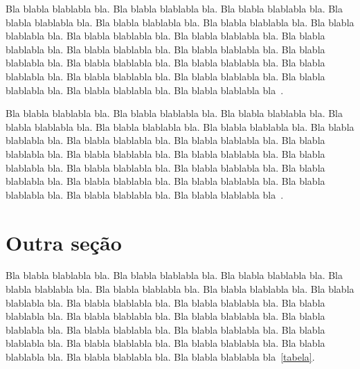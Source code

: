 \documentclass[tese,capa]{texufpel}
\begin{document}
Bla blabla blablabla bla.  Bla blabla blablabla bla.  Bla blabla
blablabla bla.  Bla blabla blablabla bla.  Bla blabla blablabla bla.
Bla blabla blablabla bla.  Bla blabla blablabla bla.  Bla blabla
blablabla bla.  Bla blabla blablabla bla.  Bla blabla blablabla bla.
Bla blabla blablabla bla.  Bla blabla blablabla bla.  Bla blabla
blablabla bla.  Bla blabla blablabla bla.  Bla blabla blablabla bla.
Bla blabla blablabla bla.  Bla blabla blablabla bla.  Bla blabla
blablabla bla.  Bla blabla blablabla bla.  Bla blabla blablabla bla.
Bla blabla blablabla bla~\citet{Moore:1979:MAI,Aguiar:2005}.

Bla blabla blablabla bla.  Bla blabla blablabla bla.  Bla blabla
blablabla bla.  Bla blabla blablabla bla.  Bla blabla blablabla bla.
Bla blabla blablabla bla.  Bla blabla blablabla bla.  Bla blabla
blablabla bla.  Bla blabla blablabla bla.  Bla blabla blablabla bla.
Bla blabla blablabla bla.  Bla blabla blablabla bla.  Bla blabla
blablabla bla.  Bla blabla blablabla bla.  Bla blabla blablabla bla.
Bla blabla blablabla bla.  Bla blabla blablabla bla.  Bla blabla
blablabla bla.  Bla blabla blablabla bla.  Bla blabla blablabla bla.
Bla blabla blablabla bla~\cite{vonNeumann:1966:TSR}.

\section{Outra seção}

Bla blabla blablabla bla.  Bla blabla blablabla bla.  Bla blabla
blablabla bla.  Bla blabla blablabla bla.  Bla blabla blablabla bla.
Bla blabla blablabla bla.  Bla blabla blablabla bla.  Bla blabla
blablabla bla.  Bla blabla blablabla bla.  Bla blabla blablabla bla.
Bla blabla blablabla bla.  Bla blabla blablabla bla.  Bla blabla
blablabla bla.  Bla blabla blablabla bla.  Bla blabla blablabla bla.
Bla blabla blablabla bla.  Bla blabla blablabla bla.  Bla blabla
blablabla bla.  Bla blabla blablabla bla.  Bla blabla blablabla bla.
Bla blabla blablabla bla~\ref{tabela}.
\end{document}

